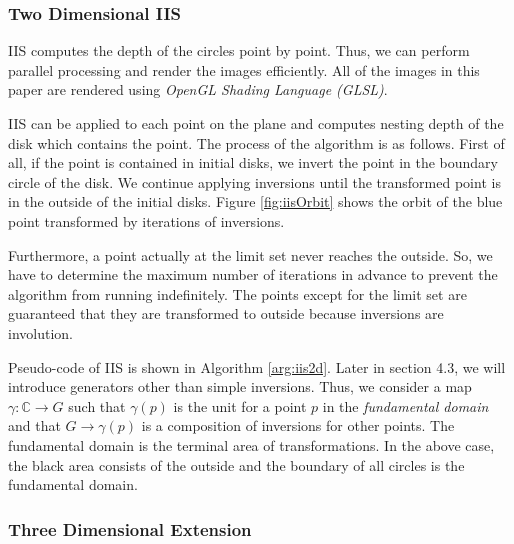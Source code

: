 \subsubsection{Two Dimensional IIS}

\noindent IIS computes the depth of the circles point by point.
Thus, we can perform parallel processing and render the images efficiently.
All of the images in this paper are rendered using
\textit{OpenGL Shading Language (GLSL)}.

IIS can be applied to each point on the plane and computes nesting depth of
the disk which contains the point.
The process of the algorithm is as follows.
First of all, if the point is contained in initial disks, we invert the
point in the boundary circle of the disk.
We continue applying inversions until the transformed point is in the
outside of the initial disks.
Figure \ref{fig:iisOrbit} shows the orbit of the blue point transformed by
iterations of inversions.

Furthermore, a point actually at the limit set never reaches the
outside. So, we have to determine the maximum number of iterations in
advance to prevent the algorithm from running indefinitely.
The points except for the limit set are guaranteed that they
are transformed to outside because inversions are involution.

Pseudo-code of IIS is shown in Algorithm \ref{arg:iis2d}.
Later in section 4.3, we will introduce generators other than simple inversions.
Thus, we consider a map $\gamma : \mathbb{C} \to G$ such that $\gamma(p)$ is the unit for a point $p$ in the
\textit{fundamental domain} and that $G \to \gamma(p)$ is a composition of inversions for other
points.
The fundamental domain is the terminal area of transformations. 
In the above case, the black area consists of the outside and the
boundary of all circles is the fundamental domain.

\subsubsection{Three Dimensional Extension}

